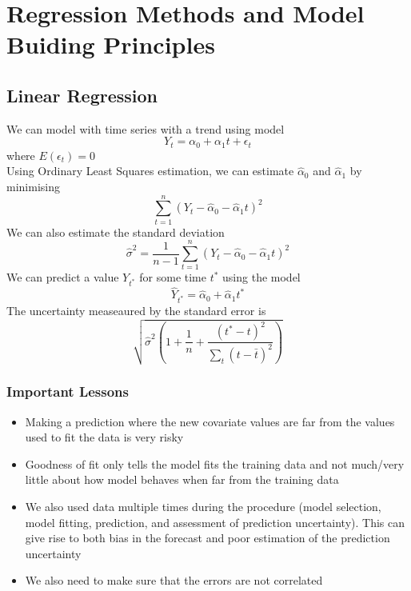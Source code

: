 \documentclass[11pt]{article}
\begin{document}
\section{Regression Methods and Model Buiding Principles}
\subsection{Linear Regression}
We can model with time series with a trend using model 
\[Y_t=\alpha_0+\alpha_1t+\epsilon_t\]    
where $E(\epsilon_t)=0$ \\
Using Ordinary Least Squares estimation, we can estimate $\hat{\alpha}_0$ and $\hat{\alpha}_1$ by minimising 
\[\sum_{t=1}^{n}(Y_t-\hat{\alpha}_0-\hat{\alpha}_1t)^2\]
We can also estimate the standard deviation 
\[\hat{\sigma}^2=\frac{1}{n-1}\sum_{t=1}^{n}(Y_t-\hat{\alpha}_0-\hat{\alpha}_1t)^2\]
We can predict a value $Y_{t^*}$ for some time $t^*$ using the model
\[\hat{Y}_{t^*}=\hat{\alpha}_0+\hat{\alpha}_1t^*\]
The uncertainty measeaured by the standard error is 
\[\sqrt{\hat{\sigma}^2(1+\frac{1}{n}+\frac{(t^*-t)^2}{\sum_{t}(t-\bar{t})^2})}\]
\subsubsection{Important Lessons}
\begin{itemize}
    \item Making a prediction where the new covariate values are far from the values used to fit the data is very risky 
    \item Goodness of fit only tells the model fits the training data and not much/very little about how model behaves when far from the training data 
    \item We also used data multiple times during the procedure (model selection, model fitting, prediction, and assessment of prediction uncertainty). This can give rise to both bias in the forecast and poor estimation of the prediction uncertainty 
    \item We also need to make sure that the errors are not correlated
\end{itemize}
\end{document}
